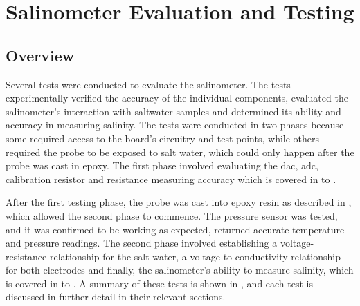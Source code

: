 
\chapter{Salinometer Evaluation and Testing}\label{ch:testing}

\section{Overview}

Several tests were conducted to evaluate the salinometer.
The tests experimentally verified the accuracy of the individual components, evaluated the salinometer's interaction with saltwater samples and determined its ability and accuracy in measuring salinity.
The tests were conducted in two phases because some required access to the board's circuitry and test points, while others required the probe to be exposed to salt water, which could only happen after the probe was cast in epoxy.
The first phase involved evaluating the \gls{dac}, \gls{adc}, calibration resistor and resistance measuring accuracy which is covered in  to .

After the first testing phase, the probe was cast into epoxy resin as described in , which allowed the second phase to commence.
The pressure sensor was tested, and it was confirmed to be working as expected, returned accurate temperature and pressure readings.
The second phase involved establishing a voltage-resistance relationship for the salt water, a voltage-to-conductivity relationship for both electrodes and finally, the salinometer's ability to measure salinity, which is covered in  to .
A summary of these tests is shown in , and each test is discussed in further detail in their relevant sections.

